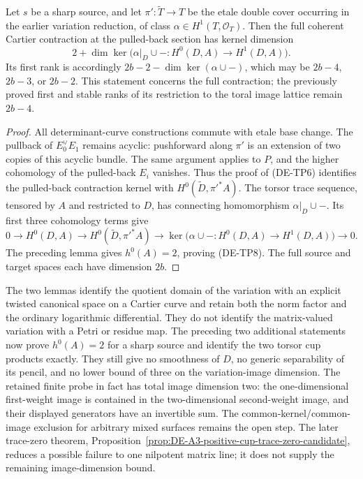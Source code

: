 \begin{corollary}
\label{cor:DE-A3-positive-first-rank-candidate}
Let $s$ be a sharp source, and let $\pi':\widetilde T\to T$ be the
etale double cover occurring in the earlier variation reduction, of
class $\alpha\in H^1(T,\mathcal O_T)$. Then the full coherent
Cartier contraction at the pulled-back section has kernel dimension
\[
        2+\dim\ker\bigl(\alpha|_D\cup-:
                     H^0(D,A)\longrightarrow H^1(D,A)\bigr).
                                                        \tag{DE-TP8}
\]
Its first rank is accordingly
$2b-2-\dim\ker(\alpha\cup-)$, which may be $2b-4$, $2b-3$,
or $2b-2$. This statement concerns the full contraction;
the previously proved first and stable ranks of its restriction
to the toral image lattice remain $2b-4$.
\end{corollary}
\begin{proof}
All determinant-curve constructions commute with etale base change.
The pullback of $E_0^\vee E_1$ remains acyclic: pushforward along
$\pi'$ is an extension of two copies of this acyclic bundle.
The same argument applies to $P$, and the higher cohomology
of the pulled-back $E_i$ vanishes. Thus the proof of (DE-TP6)
identifies the pulled-back contraction kernel with
$H^0(\widetilde D,\pi'^*A)$.
The torsor trace sequence, tensored by $A$ and restricted to $D$,
has connecting homomorphism $\alpha|_D\cup-$. Its first three
cohomology terms give
\[
 0\longrightarrow H^0(D,A)\longrightarrow
 H^0(\widetilde D,\pi'^*A)\longrightarrow
 \ker\bigl(\alpha\cup-:H^0(D,A)\to H^1(D,A)\bigr)
 \longrightarrow0.
\]
The preceding lemma gives $h^0(A)=2$, proving (DE-TP8).
The full source and target spaces each have dimension $2b$.
\end{proof}

\begin{remark}
\label{rem:DE-A3-positive-norm-pencil-scope-candidate}
The two lemmas identify the quotient domain of the variation with an
explicit twisted canonical space on a Cartier curve and retain both
the norm factor and the ordinary logarithmic differential. They do
not identify the matrix-valued variation with a Petri or residue map.
The preceding two additional statements now prove $h^0(A)=2$
for a sharp source and identify the two torsor cup products exactly.
They still give no smoothness of $D$, no generic separability of its
pencil, and no lower bound of three on the variation-image dimension.
The retained finite probe in fact has total image dimension two:
the one-dimensional first-weight image is contained in the
two-dimensional second-weight image, and their displayed generators
have an invertible sum. The common-kernel/common-image exclusion
for arbitrary mixed surfaces remains the open step. The later
trace-zero theorem, Proposition~\ref{prop:DE-A3-positive-cup-trace-zero-candidate},
reduces a possible failure to one nilpotent matrix line; it does
not supply the remaining image-dimension bound.
\end{remark}
